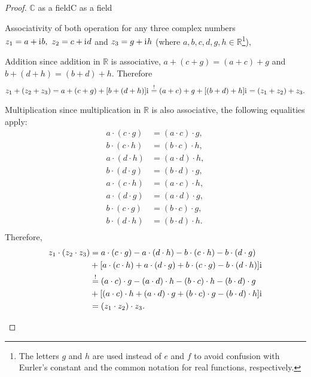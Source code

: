 \begin{proof}{$\bm{\mathbb{C}}$ as a field}{C as a field}
\begin{descitemize}
		\item[Associativity of both operation] for any three complex numbers $z_{1}=a+\mathrm{i}\mkern1mu b,\ z_{2}=c+\mathrm{i}\mkern1mu d$ and $z_{3}=g+\mathrm{i}\mkern1mu h$ (where $a,b,c,d,g,h\in\mathbb{R}$\footnote{The letters $g$ and $h$ are used instead of $e$ and $f$ to avoid confusion with Eurler's constant and the common notation for real functions, respectively.}),
			\begin{listitemize}
			\item[Addition] since addition in $\mathbb{R}$ is associative, $a+(c+g)=(a+c)+g$ and $b+(d+h)=(b+d)+h$. Therefore
				\[
					z_{1} + (z_{2}+z_{3}) = a+(c+g) + [b+(d+h)]\mathrm{i}\mkern1mu \overset{!}{=} (a+c)+g + [(b+d)+h]\mathrm{i}\mkern1mu = (z_{1}+z_{2}) + z_{3}.
				\]
			\item[Multiplication] since multiplication in $\mathbb{R}$ is also associative, the following equalities apply:
				\begin{align*}
					a\cdot(c\cdot g) &= (a\cdot c)\cdot g,\\
					b\cdot(c\cdot h) &= (b\cdot c)\cdot h,\\
					a\cdot(d\cdot h) &= (a\cdot d)\cdot h,\\
					b\cdot(d\cdot g) &= (b\cdot d)\cdot g,\\
					a\cdot(c\cdot h) &= (a\cdot c)\cdot h,\\
					a\cdot(d\cdot g) &= (a\cdot d)\cdot g,\\
					b\cdot(c\cdot g) &= (b\cdot c)\cdot g,\\
					b\cdot(d\cdot h) &= (b\cdot d)\cdot h.\\
				\end{align*}
				Therefore,
				\begin{align*}
					z_{1}\cdot(z_{2} \cdot z_{3}) &= a\cdot(c\cdot g) - a\cdot(d\cdot h) - b\cdot(c\cdot h) - b\cdot(d\cdot g)\\ &+[a\cdot(c\cdot h) + a\cdot(d\cdot g) + b\cdot(c\cdot g) - b\cdot(d\cdot h)]\mathrm{i}\mkern1mu\\
					&\overset{!}{=} (a\cdot c)\cdot g - (a\cdot d)\cdot h - (b\cdot c)\cdot h - (b\cdot d)\cdot g\\ &+[(a\cdot c)\cdot h + (a\cdot d)\cdot g + (b\cdot c)\cdot g - (b\cdot d)\cdot h]\mathrm{i}\mkern1mu\\
					&= (z_{1} \cdot z_{2}) \cdot z_{3}.
				\end{align*}
			\end{listitemize}


\end{descitemize}
\end{proof}
